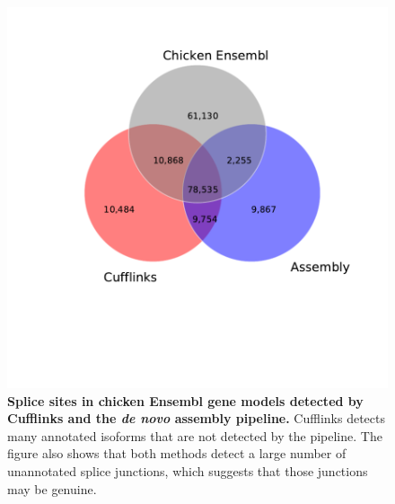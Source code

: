 \documentclass[10pt]{article}
\begin{document}
\begin{figure}[!ht]
\begin{center}
\includegraphics[width=5in]{chick_venn.pdf}
\end{center}
\caption{
{\bf Splice sites in chicken Ensembl gene models detected by Cufflinks and the \emph{de novo} assembly pipeline.}
Cufflinks detects many annotated isoforms that are not detected by the pipeline.
The figure also shows that both methods detect a large number of unannotated splice junctions, which suggests
that those junctions may be genuine.
}
\label{chick_venn}
\end{figure}
\end{document}
